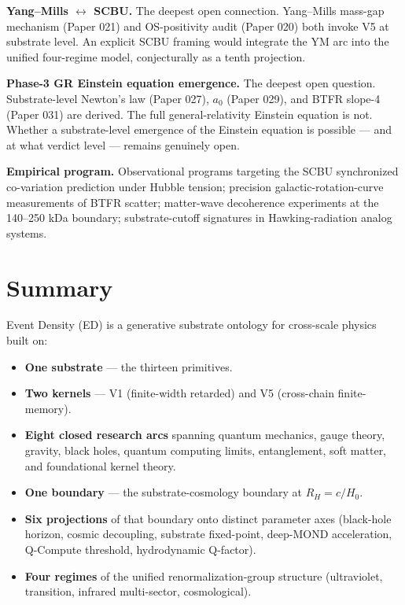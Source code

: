 \documentclass[11pt,a4paper]{article}
\begin{document}
\textbf{Yang--Mills $\leftrightarrow$ SCBU.} The deepest open connection. Yang--Mills mass-gap mechanism (Paper 021) and OS-positivity audit (Paper 020) both invoke V5 at substrate level. An explicit SCBU framing would integrate the YM arc into the unified four-regime model, conjecturally as a tenth projection.

\textbf{Phase-3 GR Einstein equation emergence.} The deepest open question. Substrate-level Newton's law (Paper 027), $a_0$ (Paper 029), and BTFR slope-4 (Paper 031) are derived. The full general-relativity Einstein equation is not. Whether a substrate-level emergence of the Einstein equation is possible --- and at what verdict level --- remains genuinely open.

\textbf{Empirical program.} Observational programs targeting the SCBU synchronized co-variation prediction under Hubble tension; precision galactic-rotation-curve measurements of BTFR scatter; matter-wave decoherence experiments at the 140--250 kDa boundary; substrate-cutoff signatures in Hawking-radiation analog systems.

\section{Summary}

Event Density (ED) is a generative substrate ontology for cross-scale physics built on:

\begin{itemize}[noitemsep]
\item \textbf{One substrate} --- the thirteen primitives.
\item \textbf{Two kernels} --- V1 (finite-width retarded) and V5 (cross-chain finite-memory).
\item \textbf{Eight closed research arcs} spanning quantum mechanics, gauge theory, gravity, black holes, quantum computing limits, entanglement, soft matter, and foundational kernel theory.
\item \textbf{One boundary} --- the substrate-cosmology boundary at $R_H = c/H_0$.
\item \textbf{Six projections} of that boundary onto distinct parameter axes (black-hole horizon, cosmic decoupling, substrate fixed-point, deep-MOND acceleration, Q-Compute threshold, hydrodynamic Q-factor).
\item \textbf{Four regimes} of the unified renormalization-group structure (ultraviolet, transition, infrared multi-sector, cosmological).
\end{itemize}
\end{document}
